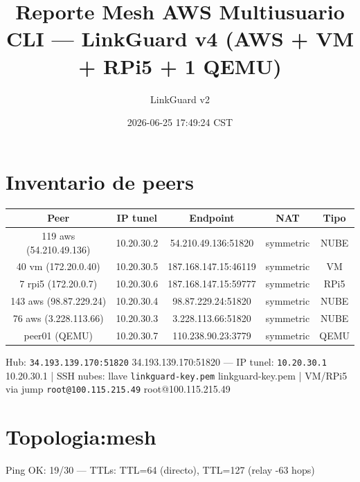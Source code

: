 \documentclass[11pt,a4paper]{article}
\title{Reporte Mesh AWS Multiusuario CLI — LinkGuard v4 (AWS + VM + RPi5 + 1 QEMU)}
\author{LinkGuard v2}
\date{2026-06-25 17:49:24 CST}
\begin{document}
\maketitle

\section{Inventario de peers}
\begin{longtable}{|c|c|c|c|c|}
\hline
Peer & IP tunel & Endpoint & NAT & Tipo \\ \hline
119 aws (54.210.49.136) & 10.20.30.2 & 54.210.49.136:51820 & symmetric & NUBE \\ \hline
40 vm (172.20.0.40) & 10.20.30.5 & 187.168.147.15:46119 & symmetric & VM \\ \hline
7 rpi5 (172.20.0.7) & 10.20.30.6 & 187.168.147.15:59777 & symmetric & RPi5 \\ \hline
143 aws (98.87.229.24) & 10.20.30.4 & 98.87.229.24:51820 & symmetric & NUBE \\ \hline
76 aws (3.228.113.66) & 10.20.30.3 & 3.228.113.66:51820 & symmetric & NUBE \\ \hline
peer01 (QEMU) & 10.20.30.7 & 110.238.90.23:3779 & symmetric & QEMU \\ \hline
\end{longtable}

Hub:  \texttt{34.193.139.170:51820} 34.193.139.170:51820  — IP tunel:  \texttt{10.20.30.1} 10.20.30.1  | SSH nubes: llave  \texttt{linkguard-key.pem} linkguard-key.pem  | VM/RPi5 via jump  \texttt{root@100.115.215.49} root@100.115.215.49\\

\section{Topologia:mesh}
Ping OK: 19/30 — TTLs: TTL=64 (directo), TTL=127 (relay -63 hops)\\
\end{document}

